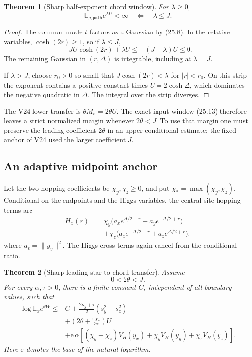 \documentclass[11pt]{article}
\newtheorem{theorem}{Theorem}[section]
\theoremstyle{remark}
\begin{document}
\begin{theorem}[Sharp half-exponent chord window]
\label{thm:v17v25-chord-window}
For \(\lambda\geq0\),
\[
 \mathbb E_{g,\mathrm{path}}e^{\lambda U}<\infty
 \quad\Longleftrightarrow\quad \lambda\leq J.    \tag{25.13}
\]
\end{theorem}

\begin{proof}
The common mode \(t\) factors as a Gaussian by (25.8).  In the relative
variables, \(\cosh(2r)\geq1\), so if \(\lambda\leq J\),
\[
 -JU\cosh(2r)+\lambda U
 \leq-(J-\lambda)U\leq0.                           \tag{25.14}
\]
The remaining Gaussian in \((r,\Delta)\) is integrable, including at
\(\lambda=J\).

If \(\lambda>J\), choose \(r_0>0\) so small that
\(J\cosh(2r)<\lambda\) for \(|r|<r_0\).  On this strip the exponent
contains a positive constant times
\(U=2\cosh\Delta\), which dominates the negative quadratic in
\(\Delta\).  The integral over the strip diverges.
\end{proof}

The V24 lower transfer is \(\theta M_x=2\theta U\).  The exact input
window (25.13) therefore leaves a strict normalized margin whenever
\(2\theta<J\).  To use that margin one must preserve the leading
coefficient \(2\theta\) in an upper conditional estimate; the fixed
anchor of V24 used the larger coefficient \(J\).

\subsection{An adaptive midpoint anchor}

Let the two hopping coefficients be \(\chi_y,\chi_z\geq0\), and put
\(\chi_*=\max(\chi_y,\chi_z)\).  Conditional on the endpoints and the
Higgs variables, the central-site hopping terms are
\[
\begin{aligned}
 H_x(r)={}&\chi_y
 \bigl(a_xe^{\Delta/2-r}+a_ye^{-\Delta/2+r}\bigr)\\
 &+\chi_z
 \bigl(a_xe^{-\Delta/2-r}+a_ze^{\Delta/2+r}\bigr),
                                                               \tag{25.15}
\end{aligned}
\]
where \(a_v=\|y_v\|^2\).  The Higgs cross terms again cancel from the
conditional ratio.

\begin{theorem}[Sharp-leading star-to-chord transfer]
\label{thm:v17v25-adaptive}
Assume
\[
 0<2\theta<J.                                      \tag{25.16}
\]
For every \(\alpha,\tau>0\), there is a finite constant \(C\),
independent of all boundary values, such that
\[
\begin{aligned}
 \log\mathbb E_x e^{\theta W}
 \leq{}&C+\frac{2\kappa_g+\tau}{2}(s_y^2+s_z^2)\\
 &+\left(2\theta+\frac{\mathrm e\,\chi_*}{2\alpha}\right)U\\
 &+\mathrm e\,\alpha\left[
 (\chi_y+\chi_z)V_H(y_x)
 +\chi_yV_H(y_y)+\chi_zV_H(y_z)
 \right].                                         \tag{25.17}
\end{aligned}
\]
Here \(\mathrm e\) denotes the base of the natural logarithm.
\end{theorem}
\end{document}
